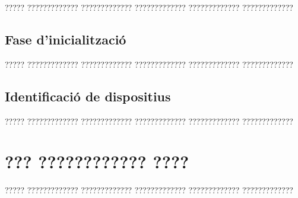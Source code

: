 \documentclass[11pt,catalan,listoffigures,listoftables]{tfgetsinf}
\begin{document}
????? ????????????? ????????????? ????????????? ????????????? ?????????????

\section{Fase d'inicialització}

????? ????????????? ????????????? ????????????? ????????????? ?????????????

\section{Identificació de dispositius}

????? ????????????? ????????????? ????????????? ????????????? ?????????????



\chapter{??? ???????????? ????}

????? ????????????? ????????????? ????????????? ????????????? ????????????? 


\end{document}
